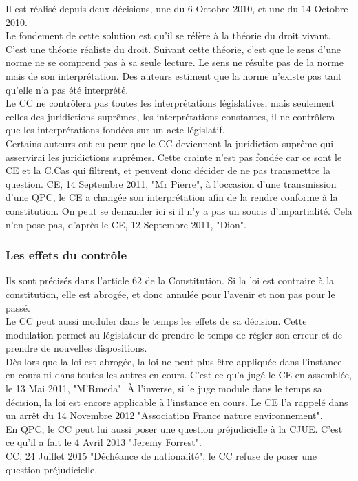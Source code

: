 \documentclass[10pt, a4paper, openany]{book}
\begin{document}
Il est réalisé depuis deux décisions, une du 6 Octobre 2010, et une du 14 Octobre 2010. \\
Le fondement de cette solution est qu'il se réfère à la théorie du droit vivant. C'est une théorie réaliste du droit. Suivant cette théorie, c'est que le sens d'une norme ne se comprend pas à sa seule lecture. Le sens ne résulte pas de la norme mais de son interprétation. Des auteurs estiment que la norme n'existe pas tant qu'elle n'a pas été interprété. \\
Le CC ne contrôlera pas toutes les interprétations législatives, mais seulement celles des juridictions suprêmes, les interprétations constantes, il ne contrôlera que les interprétations fondées sur un acte législatif. \\
Certains auteurs ont eu peur que le CC deviennent la juridiction suprême qui asservirai les juridictions suprêmes. Cette crainte n'est pas fondée car ce sont le CE et la C.Cas qui filtrent, et peuvent donc décider de ne pas transmettre la question. CE, 14 Septembre 2011, "Mr Pierre", à l'occasion d'une transmission d'une QPC, le CE a changée son interprétation afin de la rendre conforme à la constitution. On peut se demander ici si il n'y a pas un soucis d'impartialité. Cela n'en pose pas, d'après le CE, 12 Septembre 2011, "Dion". 

\subsubsection{Les effets du contrôle}

Ils sont précisés dans l'article 62 de la Constitution. Si la loi est contraire à la constitution, elle est abrogée, et donc annulée pour l'avenir et non pas pour le passé. \\
Le CC peut aussi moduler dans le temps les effets de sa décision. Cette modulation permet au législateur de prendre le temps de régler son erreur et de prendre de nouvelles dispositions. \\
Dès lors que la loi est abrogée, la loi ne peut plus être appliquée dans l'instance en cours ni dans toutes les autres en cours. C'est ce qu'a jugé le CE en assemblée, le 13 Mai 2011, "M'Rmeda". À l'inverse, si le juge module dans le temps sa décision, la loi est encore applicable à l'instance en cours. Le CE l'a rappelé dans un arrêt du 14 Novembre 2012 "Association France nature environnement". \\
En QPC, le CC peut lui aussi poser une question préjudicielle à la CJUE. C'est ce qu'il a fait le 4 Avril 2013 "Jeremy Forrest". \\
CC, 24 Juillet 2015 "Déchéance de nationalité", le CC refuse de poser une question préjudicielle. 
\end{document}
